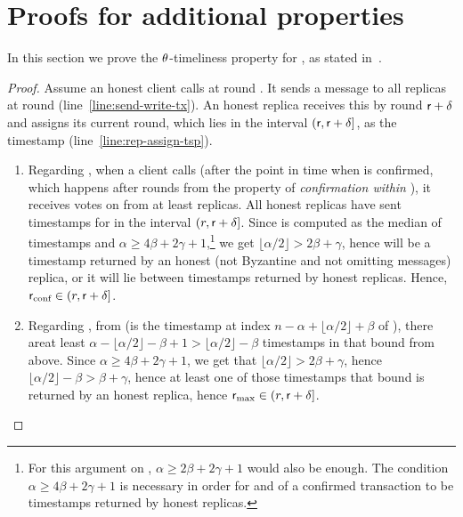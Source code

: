 \section{Proofs for additional \podtm properties}
In this section we prove the $\theta$-timeliness property for \podtm, as stated in~.

\begin{theorem}
\end{theorem}
\begin{proof}
	Assume an honest client \client calls \opwrite{\tx} at round \round.
	It sends a message \msgwrite{\tx} to all replicas at round \round (line~\ref{line:send-write-tx}).
	An honest replica receives this by round $\textsf{r} + \delta$ and assigns its current round, which lies in the interval $(\textsf{r}, \textsf{r} + \delta]$, as the timestamp (line~\ref{line:rep-assign-tsp}).
	\begin{enumerate}
		\item Regarding \rconf, when a client calls \opreadall{} (after the point in time when \tx is confirmed, which happens after \parConf rounds from the property of \emph{confirmation within \parConf}), it receives votes on \tx from at least \alpha replicas. All honest replicas have sent timestamps for \tx in the interval $ (r, \textsf{r} + \delta]$. Since \rconf is computed as the median of \alpha timestamps and $\alpha \geq 4\beta + 2\gamma + 1$,\footnote{For this argument on \rconf, $\alpha \geq 2\beta + 2\gamma + 1$ would also be enough. The condition $\alpha \geq 4\beta + 2\gamma + 1$ is necessary in order for \rmin and \rmax of a confirmed transaction to be timestamps returned by honest replicas.}
		we get $\lfloor \alpha / 2 \rfloor > 2\beta + \gamma$,
		hence \rconf will be a timestamp returned by an honest (not Byzantine and not omitting messages) replica, or it will lie between timestamps returned by honest replicas. Hence, $\textsf{r}_\text{conf} \in (r, \textsf{r} + \delta]$.

		\item Regarding \rmax, from  (\rmax is the timestamp at index $n - \alpha + \lfloor \alpha / 2 \rfloor + \beta$ of \txVotes), there areat least $\alpha - \lfloor \alpha/2 \rfloor - \beta + 1 > \lfloor \alpha/2 \rfloor - \beta$ timestamps in \txVotes that bound \rmax from above. Since $\alpha \geq 4\beta + 2 \gamma + 1$, we get that $\lfloor \alpha / 2 \rfloor > 2\beta + \gamma$, hence $\lfloor \alpha / 2 \rfloor - \beta > \beta + \gamma$, hence at least one of those timestamps that bound \rmax is returned by an honest replica, hence  $\textsf{r}_\text{max} \in (r, \textsf{r} + \delta]$.


\end{enumerate}
\end{proof}
